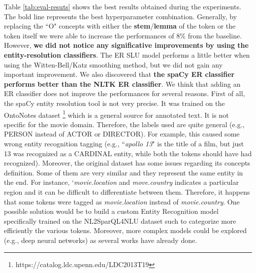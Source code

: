 \documentclass[11pt,a4paper]{article}
\begin{document}
Table \ref{tab:eval-resuts} shows the best results obtained during the experiments. The bold line represents the best hyperparameter combination. Generally, by replacing the ``O" concepts with either the \textbf{stem}/\textbf{lemma} of the token or the token itself we were able to increase the performances of 8\% from the baseline.
However, \textbf{we did not notice any significative improvements by using the entity-resolution classifiers}. The ER SLU model performs a little better when using the Witten-Bell/Katz smoothing method, but we did not gain any important improvement. We also discovered that \textbf{the spaCy ER classifier performs better than the NLTK ER classifier}. 
We think that adding an ER classifier does not improve the performances for several reasons. First of all, the spaCy entity resolution tool is not very precise. It was trained on the OntoNotes dataset \footnote{https://catalog.ldc.upenn.edu/LDC2013T19} which is a general source for annotated text. It is not specific for the movie domain. Therefore, the labels used are quite general (e.g., PERSON instead of ACTOR or DIRECTOR). For example, this caused some wrong entity recognition tagging (e.g., ``\textit{apollo 13}" is the title of a film, but just 13 was recognized as a CARDINAL entity, while both the tokens should have had recognized).
Moreover, the original dataset has some issues regarding its concepts definition. Some of them are very similar and they represent the same entity in the end. For instance, `\textit{movie.location} and \textit{move.country} indicates a particular region and it can be difficult to differentiate between them. Therefore, it happens that some tokens were tagged as \textit{movie.location} instead of \textit{movie.country}.  
One possible solution would be to build a custom Entity Recognition model specifically trained on the NL2SparQL4NLU dataset such to categorize more efficiently the various tokens. Moreover, more complex models could be explored (e.g., deep neural networks) as several works have already done.

 





\end{document}
